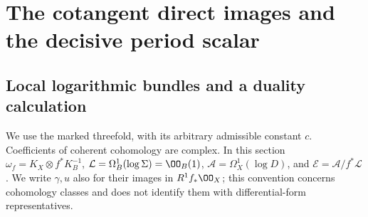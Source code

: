 \section{The cotangent direct images and the decisive period scalar}
\label{inv:sec:partA}

\subsection{Local logarithmic bundles and a duality calculation}

We use the marked threefold, with its arbitrary admissible
constant $c$.  Coefficients of coherent cohomology are complex.  In this
section $\omega_f=K_X\otimes f^*K_B^{-1}$,
$\mathcal L=\Omega_B^1(\log\Sigma)=\OO_B(1)$,
$\mathcal A=\Omega_X^1(\log D)$, and
$\mathcal E=\mathcal A/f^*\mathcal L$.  We write $\gamma,u$ also for
their images in $R^1f_*\OO_X$; this convention concerns cohomology
classes and does not identify them with differential-form representatives.

